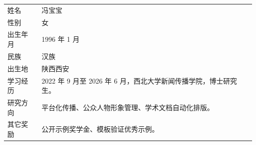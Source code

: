 \noindent\begin{tabular}{@{}p{2.8cm}p{12.2cm}@{}}
姓名 & 冯宝宝\\
性别 & 女\\
出生年月 & 1996 年 1 月\\
民族 & 汉族\\
出生地 & 陕西西安\\
学习经历 & 2022 年 9 月至 2026 年 6 月，西北大学新闻传播学院，博士研究生。\\
研究方向 & 平台化传播、公众人物形象管理、学术文档自动化排版。\\
其它奖励 & 公开示例奖学金、模板验证优秀示例。\\
\end{tabular}
